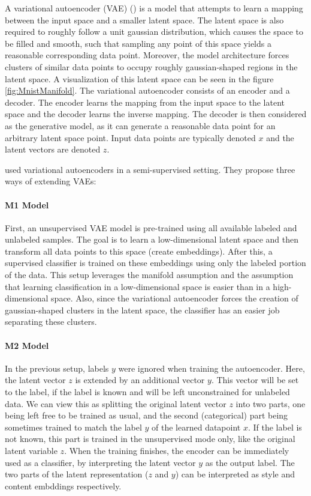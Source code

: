 A variational autoencoder (VAE) (\cite{VariationalAutoencoder}) is a model that attempts to learn a mapping between the input space and a smaller latent space. The latent space is also required to roughly follow a unit gaussian distribution, which causes the space to be filled and smooth, such that sampling any point of this space yields a reasonable corresponding data point. Moreover, the model architecture forces clusters of similar data points to occupy roughly gaussian-shaped regions in the latent space. A visualization of this latent space can be seen in the figure \ref{fig:MnistManifold}. The variational autoencoder consists of an encoder and a decoder. The encoder learns the mapping from the input space to the latent space and the decoder learns the inverse mapping. The decoder is then considered as the generative model, as it can generate a reasonable data point for an arbitrary latent space point. Input data points are typically denoted $x$ and the latent vectors are denoted $z$.

\cite{KingmaSslVae} used variational autoencoders in a semi-supervised setting. They propose three ways of extending VAEs:

\paragraph*{M1 Model}
First, an unsupervised VAE model is pre-trained using all available labeled and unlabeled samples. The goal is to learn a low-dimensional latent space and then transform all data points to this space (create embeddings). After this, a supervised classifier is trained on these embeddings using only the labeled portion of the data. This setup leverages the manifold assumption and the assumption that learning classification in a low-dimensional space is easier than in a high-dimensional space. Also, since the variational autoencoder forces the creation of gaussian-shaped clusters in the latent space, the classifier has an easier job separating these clusters.

\paragraph*{M2 Model}
In the previous setup, labels $y$ were ignored when training the autoencoder. Here, the latent vector $z$ is extended by an additional vector $y$. This vector will be set to the label, if the label is known and will be left unconstrained for unlabeled data. We can view this as splitting the original latent vector $z$ into two parts, one being left free to be trained as usual, and the second (categorical) part being sometimes trained to match the label $y$ of the learned datapoint $x$. If the label is not known, this part is trained in the unsupervised mode only, like the original latent variable $z$. When the training finishes, the encoder can be immediately used as a classifier, by interpreting the latent vector $y$ as the output label. The two parts of the latent representation ($z$ and $y$) can be interpreted as style and content embddings respectively.

